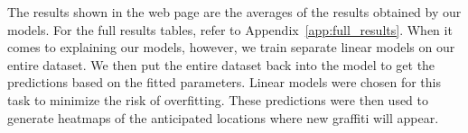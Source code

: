 The results shown in the web page are the averages of the results obtained by our models. For the full results tables, refer to Appendix~\ref{app:full_results}. When it comes to explaining our models, however, we train separate linear models on our entire dataset. We then put the entire dataset back into the model to get the predictions based on the fitted parameters. Linear models were chosen for this task to minimize the risk of overfitting. These predictions were then used to generate heatmaps of the anticipated locations where new graffiti will appear.

